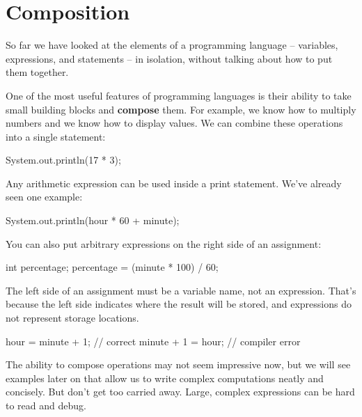 %
%

\section{Composition}


So far we have looked at the elements of a programming language -- variables, expressions, and statements -- in isolation, without talking about how to put them together.

One of the most useful features of programming languages is their ability to take small building blocks and {\bf compose} them.
For example, we know how to multiply numbers and we know how to display values.
We can combine these operations into a single statement:

\begin{code}
System.out.println(17 * 3);
\end{code}

Any arithmetic expression can be used inside a print statement.
We've already seen one example:

\begin{code}
System.out.println(hour * 60 + minute);
\end{code}

You can also put arbitrary expressions on the right side of an assignment:

\begin{code}
int percentage;
percentage = (minute * 100) / 60;
\end{code}

The left side of an assignment must be a variable name, not an expression.
That's because the left side indicates where the result will be stored, and expressions do not represent storage locations.

\begin{code}
hour = minute + 1;  // correct
minute + 1 = hour;  // compiler error
\end{code}


The ability to compose operations may not seem impressive now, but we will see examples later on that allow us to write complex computations neatly and concisely.
But don't get too carried away.
Large, complex expressions can be hard to read and debug.



